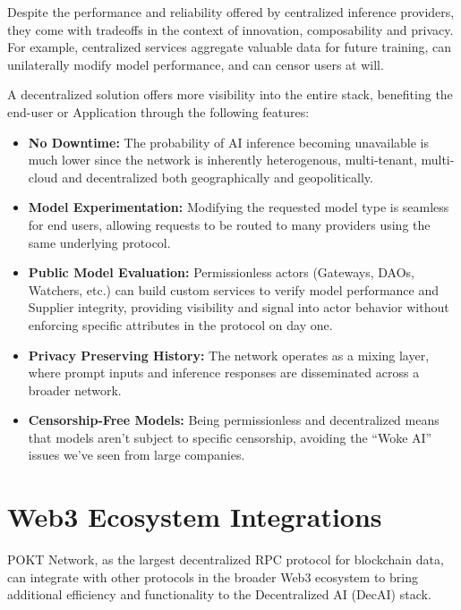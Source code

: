 \documentclass[conference,compsoc]{IEEEtran}
\begin{document}
Despite the performance and reliability offered by centralized inference providers, they come with tradeoffs in the context of innovation, composability and privacy. For example, centralized services aggregate valuable data for future training, can unilaterally modify model performance, and can censor users at will.

A decentralized solution offers more visibility into the entire stack, benefiting the end-user or Application through the following features:

\begin{itemize}
    \item \textbf{No Downtime:} The probability of AI inference becoming unavailable is much lower since the network is inherently heterogenous, multi-tenant, multi-cloud and decentralized both geographically and geopolitically.

    \item \textbf{Model Experimentation: } Modifying the requested model type is seamless for end users, allowing requests to be routed to many providers using the same underlying protocol.

    \item \textbf{Public Model Evaluation:} Permissionless actors (Gateways, DAOs, Watchers, etc.) can build custom services to verify model performance and Supplier integrity, providing visibility and signal into actor behavior without enforcing specific attributes in the protocol on day one.

    \item \textbf{Privacy Preserving History:} The network operates as a mixing layer, where prompt inputs and inference responses are disseminated across a broader network.
    
    \item \textbf{Censorship-Free Models:}  Being permissionless and decentralized means that models aren’t subject to specific censorship, avoiding the “Woke AI”~\cite{thefpGooglesWoke} issues we’ve seen from large companies.
\end{itemize}

\section{Web3 Ecosystem Integrations}

POKT Network, as the largest decentralized RPC protocol for blockchain data, can integrate with other protocols in the broader Web3 ecosystem to bring additional efficiency and functionality to the Decentralized AI (DecAI) stack.
\end{document}

